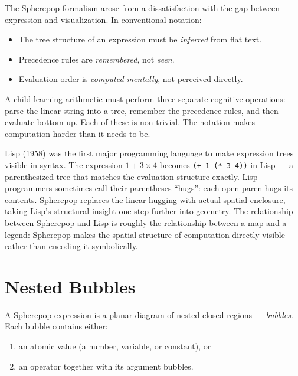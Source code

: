 The Spherepop formalism arose from a dissatisfaction with the gap between
expression and visualization. In conventional notation:

\begin{itemize}
  \item The tree structure of an expression must be \emph{inferred}
        from flat text.
  \item Precedence rules are \emph{remembered}, not \emph{seen}.
  \item Evaluation order is \emph{computed mentally}, not perceived
        directly.
\end{itemize}

A child learning arithmetic must perform three separate cognitive operations:
parse the linear string into a tree, remember the precedence rules, and then
evaluate bottom-up. Each of these is non-trivial. The notation makes
computation harder than it needs to be.

\begin{historynote}
  Lisp (1958) was the first major programming language to make expression
  trees visible in syntax. The expression $1 + 3 \times 4$ becomes
  \texttt{(+ 1 (* 3 4))} in Lisp — a parenthesized tree that matches
  the evaluation structure exactly. Lisp programmers sometimes call
  their parentheses ``hugs'': each open paren hugs its contents.
  Spherepop replaces the linear hugging with actual spatial enclosure,
  taking Lisp's structural insight one step further into geometry.
  The relationship between Spherepop and Lisp is roughly the relationship
  between a map and a legend: Spherepop makes the spatial structure of
  computation directly visible rather than encoding it symbolically.
\end{historynote}

\section{Nested Bubbles}

A Spherepop expression is a planar diagram of nested closed regions —
\emph{bubbles}. Each bubble contains either:
\begin{enumerate}
  \item an atomic value (a number, variable, or constant), or
  \item an operator together with its argument bubbles.
\end{enumerate}

